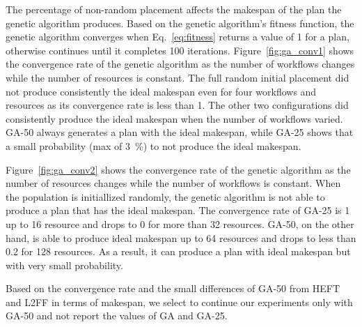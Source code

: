 The percentage of non-random placement affects the makespan of the plan the genetic algorithm produces.
Based on the genetic algorithm's fitness function, the genetic algorithm converges when Eq.~\ref{eq:fitness} returns a value of 1 for a plan, otherwise continues until it completes 100 iterations.
Figure~\ref{fig:ga_conv1} shows the convergence rate of the genetic algorithm as the number of workflows changes while the number of resources is constant.
The full random initial placement did not produce consistently the ideal makespan even for four workflows and resources as its convergence rate is less than 1.
The other two configurations did consistently produce the ideal makespan when the number of workflows varied.
GA-50 always generates a plan with the ideal makespan, while GA-25  shows that a small probability (max of 3~\%) to not produce the ideal makespan.

Figure~\ref{fig:ga_conv2} shows the convergence rate of the genetic algorithm as the number of resources changes while the number of workflows is constant.
When the population is initiallized randomly, the genetic algorithm is not able to produce a plan that has the ideal makespan.
The convergence rate of GA-25 is 1 up to 16 resource and drops to 0 for more than 32 resources.
GA-50, on the other hand, is able to produce ideal makespan up to 64 resources and drops to less than 0.2 for 128 resources.
As a result, it can produce a plan with ideal makespan but with very small probability.

Based on the convergence rate and the small differences of GA-50 from HEFT and L2FF in terms of makespan, we select to continue our experiments only with GA-50 and not report the values of GA and GA-25.

